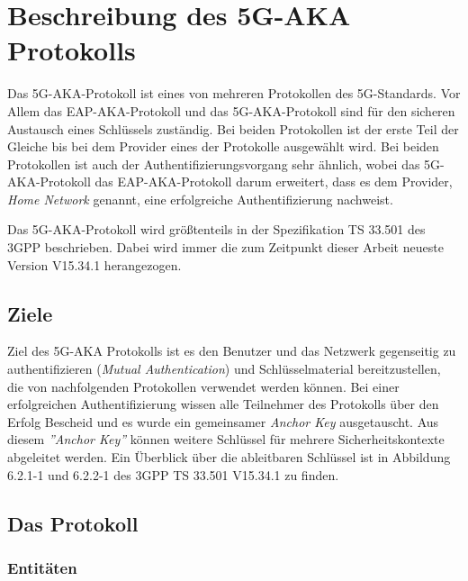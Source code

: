 \chapter{Beschreibung des 5G-AKA Protokolls}
\label{chap:2}

Das 5G-AKA-Protokoll ist eines von mehreren Protokollen des 5G-Standards.
Vor Allem das EAP-AKA-Protokoll und das 5G-AKA-Protokoll sind für den sicheren Austausch eines Schlüssels zuständig. 
Bei beiden Protokollen ist der erste Teil der Gleiche bis bei dem Provider eines der Protokolle ausgewählt wird. %
Bei beiden Protokollen ist auch der Authentifizierungsvorgang sehr ähnlich, wobei das 5G-AKA-Protokoll das EAP-AKA-Protokoll darum erweitert, dass es dem Provider, \textit{Home Network} genannt, eine erfolgreiche Authentifizierung nachweist. %

Das 5G-AKA-Protokoll wird größtenteils in der Spezifikation TS 33.501 des 3GPP beschrieben. %
Dabei wird immer die zum Zeitpunkt dieser Arbeit neueste Version V15.34.1 herangezogen.

\section{Ziele}

Ziel des 5G-AKA Protokolls ist es den Benutzer und das Netzwerk gegenseitig zu authentifizieren (\textit{Mutual Authentication}) und Schlüsselmaterial bereitzustellen, die von nachfolgenden Protokollen verwendet werden können. %
Bei einer erfolgreichen Authentifizierung wissen alle Teilnehmer des Protokolls über den Erfolg Bescheid und es wurde ein gemeinsamer \textit{Anchor Key} ausgetauscht.
Aus diesem \textit{''Anchor Key''} können weitere Schlüssel für mehrere Sicherheitskontexte abgeleitet werden.
Ein Überblick über die ableitbaren Schlüssel ist in Abbildung 6.2.1-1 und 6.2.2-1 des 3GPP TS 33.501 V15.34.1 zu finden. %

\section{Das Protokoll}

\subsection{Entitäten}%

